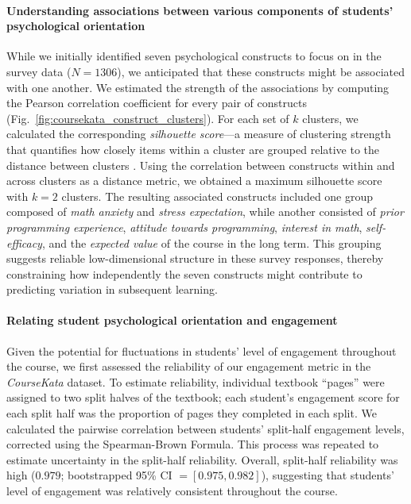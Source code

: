 \documentclass[10pt,letterpaper]{article}
\newcommand{\ck}{\textit{CourseKata}}
\begin{document}
\paragraph{Understanding associations between various components of students' psychological orientation}

While we initially identified seven psychological constructs to focus on in the survey data ($N=1306$), we anticipated that these constructs might be associated with one another.
We estimated the strength of the associations by computing the Pearson correlation coefficient for every pair of constructs (Fig.~\ref{fig:coursekata_construct_clusters}). 
For each set of $k$ clusters, we calculated the corresponding \textit{silhouette score}---a measure of clustering strength that quantifies how closely items within a cluster are grouped relative to the distance between clusters \cite{shahapure2020cluster, rousseeuw1987silhouettes}. 
Using the correlation between constructs within and across clusters as a distance metric, we obtained a maximum silhouette score with $k=2$ clusters.
The resulting associated constructs included one group composed of \textit{math anxiety} and \textit{stress expectation}, while another consisted of \textit{prior programming experience}, \textit{attitude towards programming}, \textit{interest in math}, \textit{self-efficacy}, and the \textit{expected value} of the course in the long term. 
This grouping suggests reliable low-dimensional structure in these survey responses, thereby constraining how independently the seven constructs might contribute to predicting variation in subsequent learning. 

\paragraph{Relating student psychological orientation and engagement}
Given the potential for fluctuations in students' level of engagement throughout the course, we first assessed the reliability of our engagement metric in the \ck{} dataset.
To estimate reliability, individual textbook ``pages'' were assigned to two split halves of the textbook; each student's engagement score for each split half was the proportion of pages they completed in each split. 
We calculated the pairwise correlation between students' split-half engagement levels, corrected using the Spearman-Brown Formula.
This process was repeated to estimate uncertainty in the split-half reliability.
Overall, split-half reliability was high ($0.979$; bootstrapped 95\% CI $=[0.975, 0.982]$), suggesting that students' level of engagement was relatively consistent throughout the course. 
\end{document}
